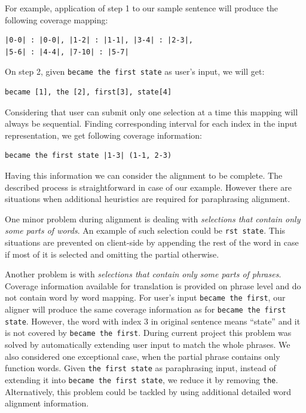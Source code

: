 For example, application of step 1 to our sample sentence will produce the following coverage mapping:

\begin{verbatim}
|0-0| : |0-0|, |1-2| : |1-1|, |3-4| : |2-3|, 
|5-6| : |4-4|, |7-10| : |5-7|
\end{verbatim}

On step 2, given \texttt{became the first state} as user's input, we will get:

\begin{verbatim}
became [1], the [2], first[3], state[4]
\end{verbatim}

Considering that user can submit only one selection at a time this mapping will always be sequential.
Finding corresponding interval for each index in the input representation, we get following coverage information:

\begin{verbatim}
became the first state |1-3| (1-1, 2-3) 
\end{verbatim}

Having this information we can consider the alignment to be complete. The described process is straightforward in case of our example. However there are situations when additional heuristics are required for paraphrasing alignment.

One minor problem during alignment is dealing with \emph{selections that contain only some parts of words}. An example of such selection could be \texttt{rst state}. This situations are prevented on client-side by appending the rest of the word in case if most of it is selected and omitting the partial otherwise.

Another problem is with \emph{selections that contain only some parts of phrases}. Coverage information available for translation is provided on phrase level and do not contain word by word mapping. For user's input \texttt{became the first}, our aligner will produce the same coverage information as for \texttt{became the first state}. However, the word with index 3 in original sentence means ``state'' and it is not covered by \texttt{became the first}. During current project this problem was solved by automatically extending user input to match the whole phrases. We also considered one exceptional case, when the partial phrase contains only function words. Given \texttt{the first state} as paraphrasing input, instead of extending it into \texttt{became the first state}, we reduce it by removing \texttt{the}. Alternatively, this problem could be tackled by using additional detailed word alignment information.


